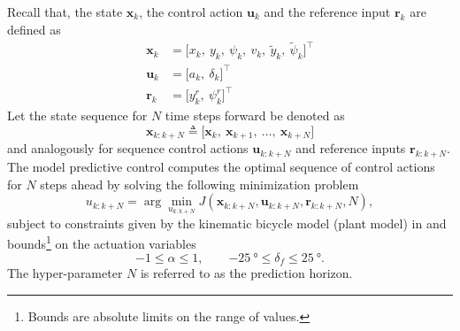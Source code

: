 \documentclass[a4paper]{article}
\begin{document}
Recall that, the state \( \bm{x}_k \), the control action \( \bm{u}_k \) and the reference input \( \bm{r}_k \) are defined as
\begin{align}
	\bm{x}_k &= \big[x_k,\ y_k,\ \psi_k,\ v_k,\ \tilde{y}_k,\ \tilde{\psi}_k \big]^\top \\
	\bm{u}_k &= \big[a_k,\ \delta_k\big]^\top \\
	\bm{r}_k &= \big[y^r_k,\ \psi^r_k \big]^\top
\end{align}
Let the state sequence for \( N \) time steps forward be denoted as 
\begin{equation}
	\bm{x}_{k:k+N} \triangleq \big[ \bm{x}_k,\ \bm{x}_{k+1},\ \ldots,\ \bm{x}_{k+N} \big]
\end{equation}
and analogously for sequence control actions \(  \bm{u}_{k:k+N} \) and reference inputs \( \bm{r}_{k:k+N} \).
The model predictive control computes the optimal sequence of control actions for \( N \) steps ahead by solving the following minimization problem
\begin{equation}
u_{k:k+N} = \arg\min_{u_{k:k+N}} J(\bm{x}_{k:k+N}, \bm{u}_{k:k+N}, \bm{r}_{k:k+N}, N),
\end{equation}
subject to constraints given by the kinematic bicycle model (plant model) in  and bounds\footnote{Bounds are absolute limits on the range of values.} on the actuation variables
\begin{equation}\label{eq:mpc_actuation_bounds}
-1 \leq \alpha \leq 1 ,\qquad \SI{-25}{\degree} \leq \delta_f \leq \SI{25}{\degree}.
\end{equation}
The hyper-parameter \( N \) is referred to as the prediction horizon.
\end{document}
